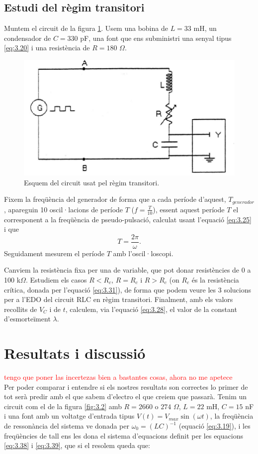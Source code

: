 \documentclass[a4paper,10.5pt]{report}
\begin{document}
\subsection{Estudi del règim transitori}
Muntem el circuit de la figura \ref{fig:3.3}. Usem una bobina de $L = 33$ mH, un condensador de $C = 330$ pF, una font que ens subministri una senyal tipus \eqref{eq:3.20} i una resistència de $R = 180$ $\Omega$.

\begin{figure}[h]
	\centering
	\includegraphics[width=0.5\linewidth]{screenshot006}
	\caption{Esquem del circuit usat pel règim transitori.}
	\label{fig:3.3}
\end{figure}

Fixem la freqüència del generador de forma que a cada període d'aquest, $T_{generador}$, apareguin 10 oscil·lacions de període $T$ ($f = \frac{T}{10}$), essent aquest període $T$ el corresponent a la freqüència de pseudo-pulsació, calculat usant l'equació \eqref{eq:3.25} i que
\begin{equation}
	T = \frac{2\pi}{\omega}.
\end{equation}
Seguidament mesurem el període $T$ amb l'oscil·loscopi. 

Canviem la resistència fixa per una de variable, que pot donar resistències de 0 a 100 k$\Omega$. Estudiem els casos $R<R_c$, $R=R_c$ i $R>R_c$ (on $R_c$ és la resistència crítica, donada per l'equació \eqref{eq:3.31}), de forma que podem veure les 3 solucions per a l'EDO del circuit RLC en règim transitori. Finalment, amb els valors recollits de $V_C$ i de $t$, calculem, via l'equació \eqref{eq:3.28}, el valor de la constant d'esmorteïment $\lambda$.
\section{Resultats i discussió}
\textcolor{red}{tengo que poner las incertezas bien a bastantes cosas, ahora no me apetece}\\
Per poder comparar i entendre si els nostres resultats son correctes lo primer de tot serà predir amb el que sabem d'electro el que creiem que passarà. Tenim un circuit com el de la figura \ref{fig:3.2} amb $R=2660$ o $274$ $\Omega$, $L=22$ mH, $C=15$ nF i una font amb un voltatge d'entrada tipus $V(t) = V_{max}\sin(\omega t)$, la freqüència de ressonància del sistema ve donada per $\omega_0 = (LC)^{-1}$ (equació \ref{eq:3.19}), i les freqüències de tall ens les dona el sistema d'equacions definit per les equacions \ref{eq:3.38} i \ref{eq:3.39}, que si el resolem queda que:
\end{document}

